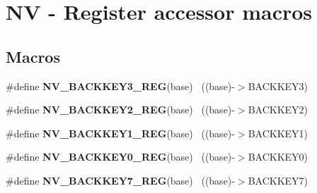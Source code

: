 \hypertarget{group___n_v___register___accessor___macros}{}\section{N\+V -\/ Register accessor macros}
\label{group___n_v___register___accessor___macros}
\subsection*{Macros}
\begin{DoxyCompactItemize}
\item 
\hypertarget{group___n_v___register___accessor___macros_ga3f3d8bddafcafafb27fb8981656492e1}{}\#define {\bfseries N\+V\+\_\+\+B\+A\+C\+K\+K\+E\+Y3\+\_\+\+R\+E\+G}(base)                                    ~((base)-\/$>$B\+A\+C\+K\+K\+E\+Y3)\label{group___n_v___register___accessor___macros_ga3f3d8bddafcafafb27fb8981656492e1}

\item 
\hypertarget{group___n_v___register___accessor___macros_gaad90d55fc5c046a8e8508b04cbe2fbbb}{}\#define {\bfseries N\+V\+\_\+\+B\+A\+C\+K\+K\+E\+Y2\+\_\+\+R\+E\+G}(base)                                    ~((base)-\/$>$B\+A\+C\+K\+K\+E\+Y2)\label{group___n_v___register___accessor___macros_gaad90d55fc5c046a8e8508b04cbe2fbbb}

\item 
\hypertarget{group___n_v___register___accessor___macros_gaa618f324e87cf548f4736270e46fcc57}{}\#define {\bfseries N\+V\+\_\+\+B\+A\+C\+K\+K\+E\+Y1\+\_\+\+R\+E\+G}(base)                                    ~((base)-\/$>$B\+A\+C\+K\+K\+E\+Y1)\label{group___n_v___register___accessor___macros_gaa618f324e87cf548f4736270e46fcc57}

\item 
\hypertarget{group___n_v___register___accessor___macros_ga905f2d4f792d634634d339e5b6170fe1}{}\#define {\bfseries N\+V\+\_\+\+B\+A\+C\+K\+K\+E\+Y0\+\_\+\+R\+E\+G}(base)                                    ~((base)-\/$>$B\+A\+C\+K\+K\+E\+Y0)\label{group___n_v___register___accessor___macros_ga905f2d4f792d634634d339e5b6170fe1}

\item 
\hypertarget{group___n_v___register___accessor___macros_ga7f6090f0eb664b59d0e6e79b492fe8e4}{}\#define {\bfseries N\+V\+\_\+\+B\+A\+C\+K\+K\+E\+Y7\+\_\+\+R\+E\+G}(base)                                    ~((base)-\/$>$B\+A\+C\+K\+K\+E\+Y7)\label{group___n_v___register___accessor___macros_ga7f6090f0eb664b59d0e6e79b492fe8e4}


\end{DoxyCompactItemize}

